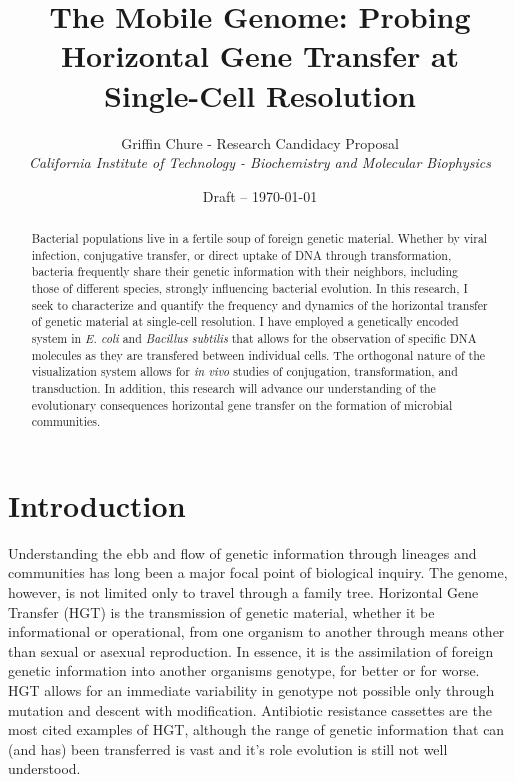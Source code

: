 


\title{The Mobile Genome: Probing Horizontal Gene Transfer at Single-Cell
Resolution}
\author{Griffin Chure - Research Candidacy Proposal\\
	\textit{\small California Institute of Technology - Biochemistry and Molecular
	Biophysics}}
\date{\small Draft -- \today}


\maketitle
\begin{abstract}
	Bacterial populations live in a fertile soup of foreign genetic
	material. Whether by viral infection, conjugative transfer, or
	direct uptake of DNA through transformation, bacteria frequently share
	their genetic information with their neighbors, including those of
	different species, strongly influencing bacterial evolution. In this
	research, I seek to characterize and quantify the frequency and dynamics
	of the horizontal transfer of genetic material at single-cell
	resolution. I have employed a genetically encoded system in \textit{E.
	coli} and \textit{Bacillus subtilis} that allows for the observation of
	specific DNA molecules as they are transfered between individual cells.
	The orthogonal nature of the visualization system allows for \textit{in
	vivo} studies of conjugation, transformation, and transduction. In
	addition, this research will advance our understanding of the
	evolutionary consequences horizontal gene transfer on the formation of
	microbial communities. 
\end{abstract}

\section*{Introduction}
Understanding the ebb and flow of genetic information through lineages and
communities has long been a major focal point of biological inquiry.  
The genome, however, is not limited only to travel through a family tree.
Horizontal Gene Transfer (HGT) is the transmission of genetic material, whether
it be informational or operational, from one organism to another through means
other than sexual or asexual reproduction. In essence, it is the assimilation 
of foreign genetic information into another organisms genotype, for better or
for worse. HGT allows for an immediate variability in genotype not possible only
through mutation and descent with modification. Antibiotic resistance cassettes
are the most cited examples of HGT, although the range of genetic information
that can (and has) been transferred is vast and it's role evolution is still not
well understood.

